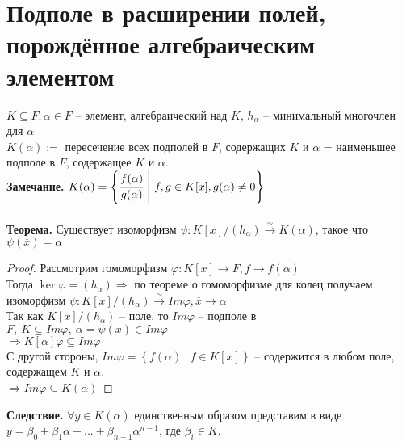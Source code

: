 \section{Подполе в расширении полей, порождённое алгебраическим элементом}

$K\subseteq F, \alpha \in F$ -- элемент, алгебраический над $K$, $h_\alpha$ -- минимальный многочлен для $\alpha$\\
$K(\alpha):=$ пересечение всех подполей в $F$, содержащих $K$ и $\alpha$ = наименьшее подполе в $F$, содержащее $K$ и $\alpha$.\\
\textbf{Замечание.} $K(\alpha)=\left\{ \cfrac{f(\alpha)}{g(\alpha)} \ \Biggl| \ f,g\in K[x], g(\alpha)\neq0 \right\}$\\\\
\textbf{Теорема.} Существует изоморфизм $\psi :K[x]/(h_\alpha)\xrightarrow{\sim} K(\alpha)$, такое что $\psi(\overline{x})=\alpha$ \\
\begin{proof}
    Рассмотрим гомоморфизм $\varphi: K[x]\to F, f\to f(\alpha)$\\
    Тогда $\ker\varphi=(h_\alpha)\Rightarrow $ по теореме о гомоморфизме для колец получаем изоморфизм $\psi:K[x]/(h_\alpha)\xrightarrow{\sim} Im\varphi, \overline{x}\to\alpha$\\
    Так как $K[x]/(h_\alpha)$ -- поле, то $Im\varphi$ -- подполе в $F,\ K\subseteq Im\varphi, \ \alpha=\psi(\overline{x})\in Im\varphi$\\
    $\Rightarrow K[\alpha]\varphi\subseteq Im\varphi$\\
    С другой стороны, $Im\varphi =\left\{ f(\alpha)\ |\ f\in K[x] \right\}$ -- содержится в любом поле, содержащем $K$ и $\alpha$.\\
    $\Rightarrow Im\varphi\subseteq K(\alpha)$
\end{proof}
\noindent \textbf{Следствие.} $\forall y\in K(\alpha)$ единственным образом представим в виде $y=\beta_0+\beta_1\alpha+...+\beta_{n-1}\alpha^{n-1}$, где $\beta_i\in K$.